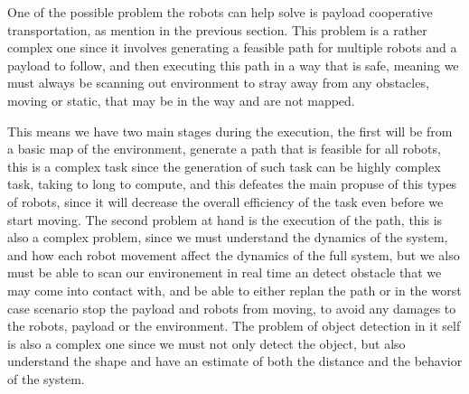 One of the possible problem the robots can help solve is payload cooperative transportation, as mention in the previous section. This problem is a rather complex one since it involves generating a feasible path for multiple robots and a payload to follow, and then executing this path in a way that is safe, meaning we must always be scanning out environment to stray away from any obstacles, moving or static, that may be in the way and are not mapped. 

This means we have two main stages during the execution, the first will be from a basic map of the environment, generate a path that is feasible for all robots, this is a complex task since the generation of such task can be highly complex task, taking to long to compute, and this defeates the main propuse of this types of robots, since it will decrease the overall efficiency of the task even before we start moving. The second problem at hand is the execution of the path, this is also a complex problem, since we must understand the dynamics of the system, and how each robot movement affect the dynamics of the full system, but we also must be able to scan our environement in real time an detect obstacle that we may come into contact with, and be able to either replan the path or in the worst case scenario stop the payload and robots from moving, to avoid any damages to the robots, payload or the environment. The problem of object detection in it self is also a complex one since we must not only detect the object, but also understand the shape and have an estimate of both the distance and the behavior of the system.